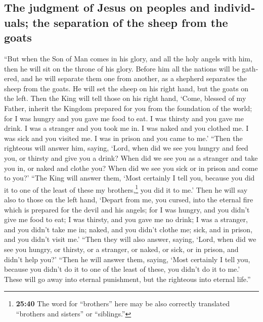 \begin{paracol}{2}
\begin{otherlanguage}{english}
{\subsection{The judgment of Jesus on peoples and individuals; the
separation of the sheep from the
goats}\label{the-judgment-of-jesus-on-peoples-and-individuals-the-separation-of-the-sheep-from-the-goats}}

 ``But when the Son of Man comes in his glory, and all
the holy angels with him, then he will sit on the throne of his glory.
 Before him all the nations will be gathered, and he will
separate them one from another, as a shepherd separates the sheep from
the goats.  He will set the sheep on his right hand, but
the goats on the left.  Then the King will tell those on
his right hand, `Come, blessed of my Father, inherit the Kingdom
prepared for you from the foundation of the world;  for I
was hungry and you gave me food to eat. I was thirsty and you gave me
drink. I was a stranger and you took me in.  I was naked
and you clothed me. I was sick and you visited me. I was in prison and
you came to me.'  ``Then the righteous will answer him,
saying, `Lord, when did we see you hungry and feed you, or thirsty and
give you a drink?  When did we see you as a stranger and
take you in, or naked and clothe you?  When did we see
you sick or in prison and come to you?'  ``The King will
answer them, `Most certainly I tell you, because you did it to one of
the least of these my brothers,\footnote{\textbf{25:40} The word for
  ``brothers'' here may be also correctly translated ``brothers and
  sisters'' or ``siblings.''} you did it to me.'  Then he
will say also to those on the left hand, `Depart from me, you cursed,
into the eternal fire which is prepared for the devil and his angels;
 for I was hungry, and you didn't give me food to eat; I
was thirsty, and you gave me no drink;  I was a stranger,
and you didn't take me in; naked, and you didn't clothe me; sick, and in
prison, and you didn't visit me.'  ``Then they will also
answer, saying, `Lord, when did we see you hungry, or thirsty, or a
stranger, or naked, or sick, or in prison, and didn't help you?'
 ``Then he will answer them, saying, `Most certainly I
tell you, because you didn't do it to one of the least of these, you
didn't do it to me.'  These will go away into eternal
punishment, but the righteous into eternal life.''


\end{otherlanguage}
\end{paracol}
